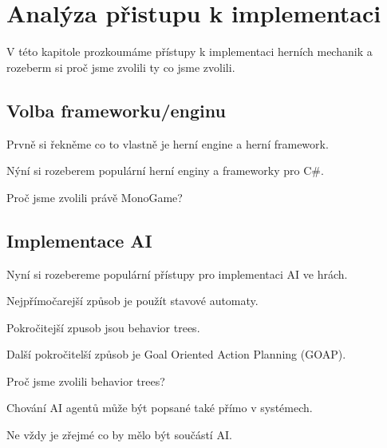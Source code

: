 \chapter{Analýza přistupu k implementaci}

V této kapitole prozkoumáme přístupy k implementaci herních mechanik a rozeberm si proč jsme zvolili ty co jsme zvolili.

\section{Volba frameworku/enginu}

Prvně si řekněme co to vlastně je herní engine a herní framework.

Nýní si rozeberem populární herní enginy a frameworky pro C\#.

Proč jsme zvolili právě MonoGame?


\section{Implementace AI}

Nyní si rozebereme populární přístupy pro implementaci AI ve hrách.

Nejpřímočarejší způsob je použít stavové automaty.

Pokročitejší zpusob jsou behavior trees.

Další pokročitelší způsob je Goal Oriented Action Planning (GOAP).

Proč jsme zvolili behavior trees?

Chování AI agentů může být popsané také přímo v systémech.

Ne vždy je zřejmé co by mělo být součástí AI.


